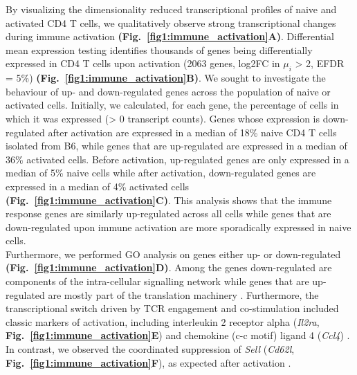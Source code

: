 By visualizing the dimensionality reduced transcriptional profiles of naive and activated CD4\plus{} T cells, we qualitatively observe strong transcriptional changes during immune activation \textbf{(Fig.~\ref{fig1:immune_activation}A)}. Differential mean expression testing identifies thousands of genes being differentially expressed in CD4\plus{} T cells upon activation (2063 genes, log2FC in $\mu_i$ > 2, EFDR = 5\%) \textbf{(Fig.~\ref{fig1:immune_activation}B)}. We sought to investigate the behaviour of up- and down-regulated genes across the population of naive or activated cells. Initially, we calculated, for each gene, the percentage of cells in which it was expressed (> 0 transcript counts). Genes whose expression is down-regulated after activation are expressed in a median of 18\% naive CD4\plus{} T cells isolated from B6, while genes that are up-regulated are expressed in a median of 36\% activated cells. Before activation, up-regulated genes are only expressed in a median of 5\% naive cells while after activation, down-regulated genes are expressed in a median of 4\% activated cells \textbf{(Fig.~\ref{fig1:immune_activation}C)}. This analysis shows that the immune response genes are similarly up-regulated across all cells while genes that are down-regulated upon immune activation are more sporadically expressed in naive cells. \\

Furthermore, we performed GO analysis on genes either up- or down-regulated \textbf{(Fig.~\ref{fig1:immune_activation}D)}. Among the genes down-regulated are components of the intra-cellular signalling network while genes that are up-regulated are mostly part of the translation machinery \citep{Bjur2013}. Furthermore, the transcriptional switch driven by TCR engagement and co-stimulation included classic markers of activation, including interleukin 2 receptor alpha (\textit{Il2ra}, \textbf{Fig.~\ref{fig1:immune_activation}E}) and chemokine (c-c motif) ligand 4 (\textit{Ccl4}) \citep{Asmal2003}. In contrast, we observed the coordinated suppression of \textit{Sell} (\textit{Cd62l}, \textbf{Fig.~\ref{fig1:immune_activation}F}), as expected after activation \citep{Park2005}.

\newpage

